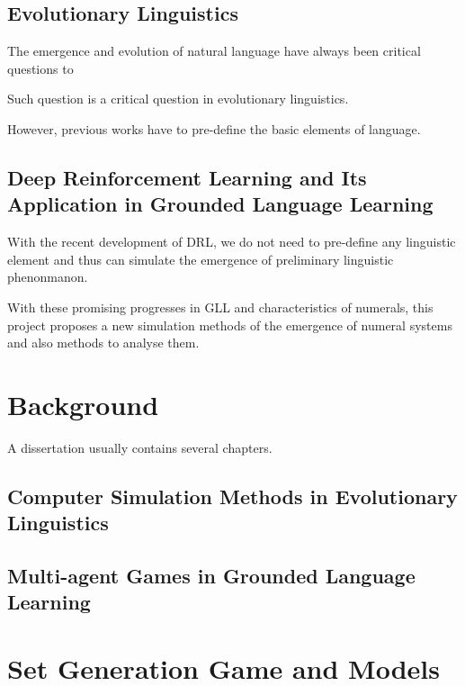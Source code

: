 \documentclass[msc,deptreport]{infthesis} %
\begin{document}
\section{Evolutionary Linguistics}
\label{sec1.1:evo_lang}

The emergence and evolution of natural language have always been critical questions to 

Such question is a critical question in evolutionary linguistics.

However, previous works have to pre-define the basic elements of language.

\section{Deep Reinforcement Learning and Its Application in Grounded Language Learning}
\label{sec1.2:DRL_GLL}

With the recent development of DRL, we do not need to pre-define any linguistic element and thus can simulate the emergence of preliminary linguistic phenonmanon.

With these promising progresses in GLL and characteristics of numerals, this project proposes a new simulation methods of the emergence of numeral systems and also methods to analyse them.


\chapter{Background}
\label{ch2:background}

A dissertation usually contains several chapters.

\section{Computer Simulation Methods in Evolutionary Linguistics}
\label{sec2.1:evolang}

\section{Multi-agent Games in Grounded Language Learning}
\label{sec2.2:gll}




\chapter{Set Generation Game and Models}
\label{ch3:game_model}
\end{document}
